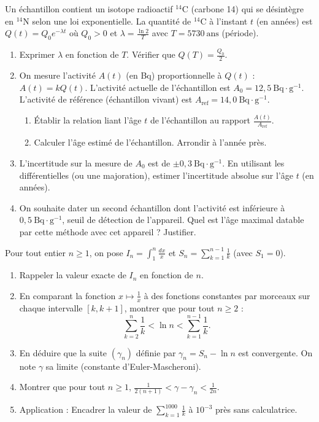 \documentclass[11pt]{article}
\begin{document}
\begin{exercice}
Un échantillon contient un isotope radioactif $^{14}\text{C}$ (carbone 14) qui se désintègre en $^{14}\text{N}$ selon une loi exponentielle. La quantité de $^{14}\text{C}$ à l'instant $t$ (en années) est $Q(t) = Q_0 e^{-\lambda t}$ où $Q_0 > 0$ et $\lambda = \frac{\ln 2}{T}$ avec $T = 5730~\text{ans}$ (période).
\begin{enumerate}
    \item Exprimer $\lambda$ en fonction de $T$. Vérifier que $Q(T) = \frac{Q_0}{2}$.
    \item On mesure l'activité $A(t)$ (en Bq) proportionnelle à $Q(t)$ : $A(t) = k Q(t)$. L'activité actuelle de l'échantillon est $A_0 = 12,5~\text{Bq}\cdot\text{g}^{-1}$. L'activité de référence (échantillon vivant) est $A_{\text{ref}} = 14,0~\text{Bq}\cdot\text{g}^{-1}$.
    \begin{enumerate}
        \item Établir la relation liant l'âge $t$ de l'échantillon au rapport $\frac{A(t)}{A_{\text{ref}}}$.
        \item Calculer l'âge estimé de l'échantillon. Arrondir à l'année près.
    \end{enumerate}
    \item L'incertitude sur la mesure de $A_0$ est de $\pm 0,3~\text{Bq}\cdot\text{g}^{-1}$. En utilisant les différentielles (ou une majoration), estimer l'incertitude absolue sur l'âge $t$ (en années).
    \item On souhaite dater un second échantillon dont l'activité est inférieure à $0,5~\text{Bq}\cdot\text{g}^{-1}$, seuil de détection de l'appareil. Quel est l'âge maximal datable par cette méthode avec cet appareil ? Justifier.
\end{enumerate}
\end{exercice}

\begin{exercice}
Pour tout entier $n \ge 1$, on pose $I_n = \int_1^n \frac{dx}{x}$ et $S_n = \sum_{k=1}^{n-1} \frac{1}{k}$ (avec $S_1 = 0$).
\begin{enumerate}
    \item Rappeler la valeur exacte de $I_n$ en fonction de $n$.
    \item En comparant la fonction $x \mapsto \frac{1}{x}$ à des fonctions constantes par morceaux sur chaque intervalle $[k, k+1]$, montrer que pour tout $n \ge 2$ :
    \[
    \sum_{k=2}^{n} \frac{1}{k} < \ln n < \sum_{k=1}^{n-1} \frac{1}{k}.
    \]
    \item En déduire que la suite $(\gamma_n)$ définie par $\gamma_n = S_n - \ln n$ est convergente. On note $\gamma$ sa limite (constante d'Euler-Mascheroni).
    \item Montrer que pour tout $n \ge 1$, $\frac{1}{2(n+1)} < \gamma - \gamma_n < \frac{1}{2n}$.
    \item Application : Encadrer la valeur de $\sum_{k=1}^{1000} \frac{1}{k}$ à $10^{-3}$ près sans calculatrice.
\end{enumerate}
\end{exercice}
\end{document}
